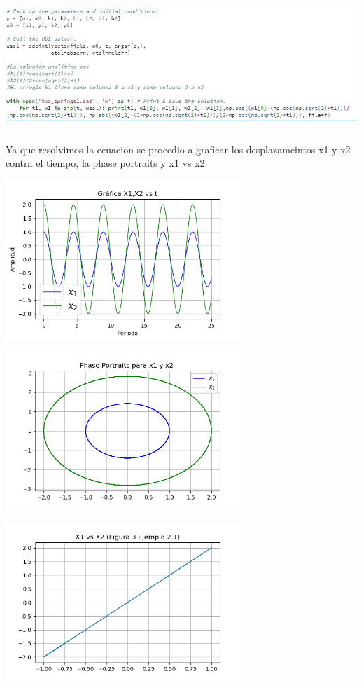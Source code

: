 \documentclass{article}
\begin{document}
\begin{center}
\includegraphics[height=5cm]{cod3.png}
\end{center}

Ya que resolvimos la ecuacion se procedio a graficar los desplazameintos x1 y x2 contra el tiempo, la phase portraits y x1 vs x2:

\begin{center}
\includegraphics[height=6cm]{resorte2_1.png}
\end{center}

\begin{center}
\includegraphics[height=6cm]{resorte2_1_2.png}
\end{center}

\begin{center}
\includegraphics[height=6cm]{resorte2_1_3.png}
\end{center}
\end{document}
